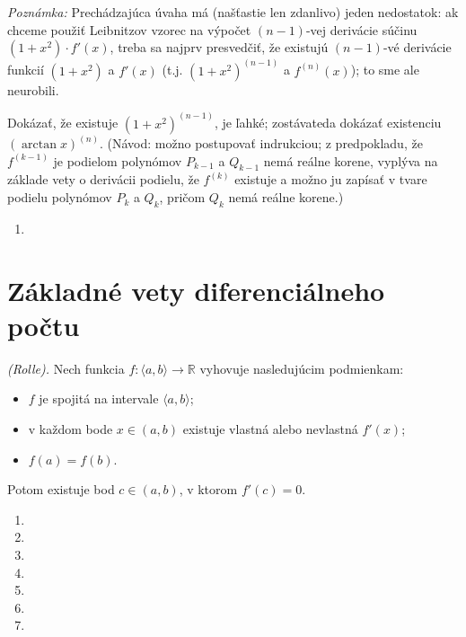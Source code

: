 \textit{Poznámka:}
Prechádzajúca úvaha má (našťastie len zdanlivo) jeden nedostatok: ak chceme použiť Leibnitzov vzorec na výpočet $(n-1)$-vej derivácie súčinu $(1+x^2)\cdot f'(x)$, treba sa najprv presvedčiť, že existujú $(n-1)$-vé derivácie funkcií $(1+x^2)$ a $f'(x)$ (t.j. $(1+x^2)^{(n-1)}$ a $f^{(n)}(x)$); to sme ale neurobili.

Dokázať, že existuje $(1+x^2)^{(n-1)}$, je ľahké; zostávateda dokázať existenciu $(\arctan x)^{(n)}$. (Návod: možno postupovať indrukciou; z predpokladu, že $f^{(k-1)}$ je podielom polynómov $P_{k-1}$ a $Q_{k-1}$ nemá reálne korene, vyplýva na základe vety o derivácii podielu, že $f^{(k)}$ existuje a možno ju zapísať v tvare podielu polynómov $P_k$ a $Q_k$, pričom $Q_k$ nemá reálne korene.)

\begin{enumerate}[resume]
	\item {}
\end{enumerate}

\section{Základné vety diferenciálneho počtu}
\begin{veta}
\textit{(Rolle).}
Nech funkcia $f:\langle a,b \rangle\rightarrow \mathbb{R}$ vyhovuje nasledujúcim podmienkam:
\begin{itemize}
\item $f$ je spojitá na intervale $\langle a,b \rangle$;
\item v každom bode $x\in (a,b)$ existuje vlastná alebo nevlastná $f'(x)$; 
\item $f(a)=f(b)$.
\end{itemize}
Potom existuje bod $c\in (a,b)$, v ktorom $f'(c)=0$.
\end{veta}

\begin{enumerate}[resume]
	\item {}
	\item {}
	\item {}
	\item {}
	\item {}
	\item {}
	\item {}
\end{enumerate}

